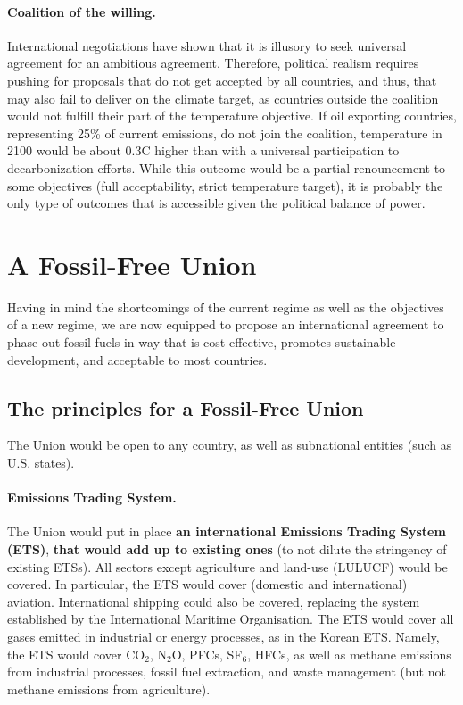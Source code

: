 \documentclass[12pt,english]{article}
\begin{document}
\paragraph{Coalition of the willing.} International negotiations have shown that it is illusory to seek universal agreement for an ambitious agreement. Therefore, political realism requires pushing for proposals that do not get accepted by all countries, and thus, that may also fail to deliver on the climate target, as countries outside the coalition would not fulfill their part of the temperature objective. If oil exporting countries, representing 25\% of current emissions, do not join the coalition, temperature in 2100 would be about 0.3\textdegree{}C higher than with a universal participation to decarbonization efforts. While this outcome would be a partial renouncement to some objectives (full acceptability, strict temperature target), it is probably the only type of outcomes that is accessible given the political balance of power.

\clearpage
\section{A Fossil-Free Union\label{sec:ffu}}

Having in mind the shortcomings of the current regime as well as the objectives of a new regime, we are now equipped to propose an international agreement to phase out fossil fuels in way that is cost-effective, promotes sustainable development, and acceptable to most countries. 

\subsection{The principles for a Fossil-Free Union\label{subsec:principles}}

The Union would be open to any country, as well as subnational entities (such as U.S. states). 

\paragraph{Emissions Trading System.}
The Union would put in place \textbf{an international Emissions Trading System (ETS)}, \textbf{that would add up to existing ones} (to not dilute the stringency of existing ETSs). All sectors except agriculture and land-use (LULUCF) would be covered. In particular, the ETS would cover (domestic and international) aviation. International shipping could also be covered, replacing the system established by the International Maritime Organisation. The ETS would cover all gases emitted in industrial or energy processes, as in the Korean ETS. Namely, the ETS would cover CO$_\text{2}$, N$_\text{2}$O, PFCs, SF$_\text{6}$, HFCs, as well as methane emissions from industrial processes, fossil fuel extraction, and waste management (but not methane emissions from agriculture). %
\end{document}
